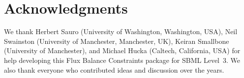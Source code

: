 
\section{Acknowledgments}

We thank Herbert Sauro (University of Washington, Washington, USA), Neil
Swainston (University of Manchester, Manchester, UK), Keiran Smallbone
(University of Manchester), and Michael Hucka (Caltech, California, USA)
for help developing this Flux Balance Constraints package for SBML
Level~3.  We also thank everyone who contributed ideas and discussion over
the years.

